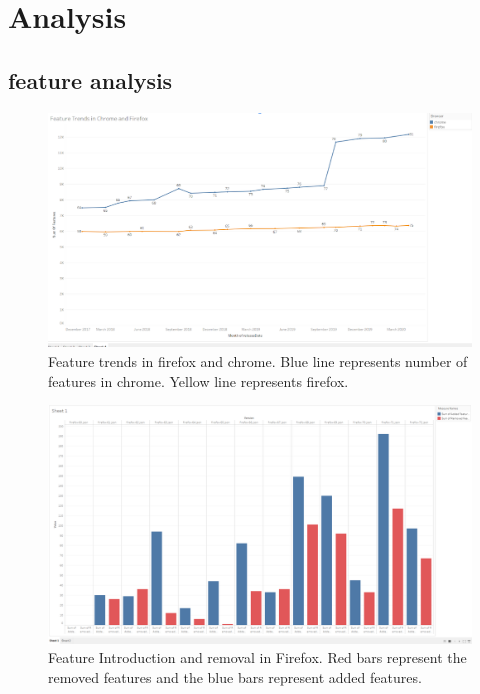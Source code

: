 \section{Analysis}
\label{sec: analysis}


\subsection{feature analysis}

\begin{figure}[ht]
    \centering
    \includegraphics[width=\columnwidth]{figures/firefox-chrome-trends.png}
    \caption{Feature trends in firefox and chrome. Blue line represents number of features in chrome. Yellow line represents firefox.}
    \label{fig:times_bar}
\end{figure}

\begin{figure}[ht]
    \centering
    \includegraphics[width=\columnwidth]{figures/addremove-feature-trend-firefox}
    \caption{Feature Introduction and removal in Firefox. Red bars represent the removed features and the blue bars represent added features.}
    \label{fig:times_bar}
\end{figure}


